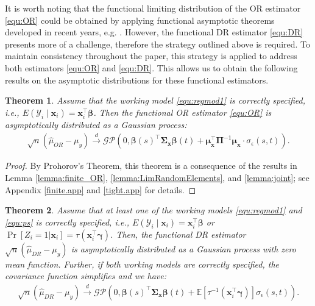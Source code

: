 \documentclass[12pt, A4]{article}
\newtheorem{theorem}{Theorem}
\newcommand{\LogCoe}{\boldsymbol{\gamma}}
\begin{document}
        It is worth noting that the functional limiting distribution of the OR estimator \eqref{equ:OR} could be obtained by applying functional asymptotic theorems developed in recent years, e.g. \cite{telschow2022simultaneous}. However, the functional DR estimator \eqref{equ:DR} presents more of a challenge, therefore the strategy outlined above is required.  
        To maintain consistency throughout the paper, this strategy is applied to address both estimators \eqref{equ:OR} and \eqref{equ:DR}. This allows us to obtain the following results on the asymptotic distributions for these functional estimators.
            \begin{theorem}\label{thm:tight:OR}
                Assume that the working model \eqref{equ:regmod1} is correctly specified, i.e., $E(\mathcal{Y}_i \mid \mathbf{x}_i) = \mathbf{x}_i^{\top}\boldsymbol{\beta}$. Then the functional OR estimator \eqref{equ:OR} is asymptotically distributed as a Gaussian process:
                \begin{align*}
                    \sqrt{n}(\hat{\mu}_{OR} - \mu_y) \overset{d}{\rightarrow} \mathcal{GP}(0,\boldsymbol{\beta}(s)^{\top} \boldsymbol{\Sigma}_{\mathbf{x}} \boldsymbol{\beta}(t) + \boldsymbol{\mu}_{\mathbf{x}}^{\top} \boldsymbol{\Pi}^{-1} \boldsymbol{\mu}_{\mathbf{x}} \cdot \sigma_\epsilon(s,t)).
                \end{align*}
            \end{theorem}
            \begin{proof}
                By Prohorov's Theorem, this theorem is a consequence of the results in Lemma \ref{lemma:finite_OR}, \ref{lemma:LimRandomElements}, and \ref{lemma:joint}; see Appendix \ref{finite.app} and \ref{tight.app} for details.
            \end{proof}
            \begin{theorem}\label{thm:tight:DR}
                Assume that at least one of the working models \eqref{equ:regmod1} and \eqref{equ:ps} is correctly specified, i.e., $E(\mathcal{Y}_i \mid \mathbf{x}_i) = \mathbf{x}_i^{\top}\boldsymbol{\beta}$ or $\Pr[ Z_i=1 | \mathbf{x}_i ]= \tau(\mathbf{x}_i^{\top} \LogCoe)$.
                Then, the functional DR estimator $\sqrt{n}(\hat{\mu}_{DR} - \mu_y)$ is asymptotically distributed as a Gaussian process with zero mean function. Further, if both working models are correctly specified, the covariance function simplifies and we have:
                \begin{align*}
                    \sqrt{n}(\hat{\mu}_{DR} - \mu_y) \overset{d}{\rightarrow} \mathcal{GP}(0,
                \boldsymbol{\beta}(s)^{\top} \boldsymbol{\Sigma}_{\mathbf{x}} \boldsymbol{\beta}(t) + \mathbb{E} [\tau^{-1}(\mathbf{x}_i^{\top}\LogCoe)]\sigma_\epsilon(s,t)).
                \end{align*}
            \end{theorem}
\end{document}
